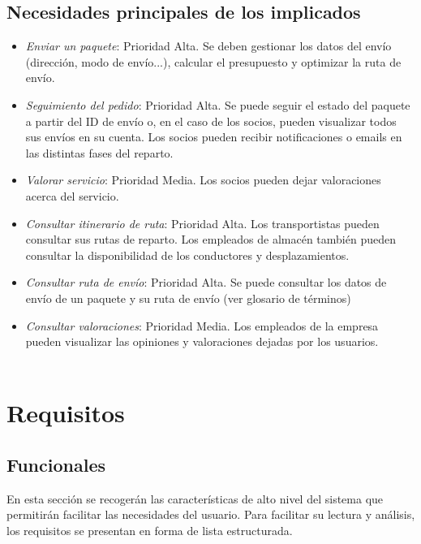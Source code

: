 	\subsection{Necesidades principales de los implicados}
	\begin{itemize}
		\item \textit{Enviar un paquete}: Prioridad Alta. Se deben gestionar los datos del envío (dirección, modo de envío...), calcular el presupuesto y optimizar la ruta de envío.
		\item \textit{Seguimiento del pedido}: Prioridad Alta. Se puede seguir el estado del paquete a partir del ID de envío o, en el caso de los socios, pueden visualizar todos sus envíos en su cuenta. Los socios pueden recibir notificaciones o emails en las distintas fases del reparto.
		\item \textit{Valorar servicio}: Prioridad Media. Los socios pueden dejar valoraciones acerca del servicio.
		\item \textit{Consultar itinerario de ruta}: Prioridad Alta. Los transportistas pueden consultar sus rutas de reparto. Los empleados de almacén también pueden consultar la disponibilidad de los conductores y desplazamientos.
		\item \textit{Consultar ruta de envío}: Prioridad Alta. Se puede consultar los datos de envío de un paquete y su ruta de envío (ver glosario de términos)
		\item \textit{Consultar valoraciones}: Prioridad Media. Los empleados de la empresa pueden visualizar las opiniones y valoraciones dejadas por los usuarios.\\ \\
	\end{itemize}

\newpage

\section{Requisitos}
\subsection{Funcionales}
En esta sección se recogerán las características de alto nivel del sistema que permitirán facilitar las necesidades del usuario. Para facilitar su lectura y análisis, los requisitos se presentan en forma de lista estructurada. 


